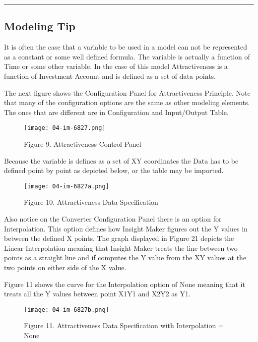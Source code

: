 \documentclass[]{memoir}
\makeatletter
\def\maxwidth{\ifdim\Gin@nat@width>\linewidth\linewidth
\else\Gin@nat@width\fi}
\let\Oldincludegraphics\includegraphics
\renewcommand{\includegraphics}[1]{\Oldincludegraphics[width=\maxwidth]{#1}}
\makeatother
\begin{document}
\begin{center}\rule{3in}{0.4pt}\end{center}

\subsection{Modeling Tip}

It is often the case that a variable to be used in a model can not be
represented as a constant or some well defined formula. The variable is
actually a function of Time or some other variable. In the case of this
model Attractiveness is a function of Investment Account and is defined
as a set of data points.

The next figure shows the Configuration Panel for Attractiveness
Principle. Note that many of the configuration options are the same as
other modeling elements. The ones that are different are in
Configuration and Input/Output Table.

\begin{figure}[htbp]
\centering
\texttt{[image: 04-im-6827.png]}
\caption{Figure 9. Attractiveness Control Panel}
\end{figure}

Because the variable is defines as a set of XY coordinates the Data has
to be defined point by point as depicted below, or the table may be
imported.

\begin{figure}[htbp]
\centering
\texttt{[image: 04-im-6827a.png]}
\caption{Figure 10. Attractiveness Data Specification}
\end{figure}

Also notice on the Converter Configuration Panel there is an option for
Interpolation. This option defines how Insight Maker figures out the Y
values in between the defined X points. The graph displayed in Figure 21
depicts the Linear Interpolation meaning that Insight Maker treats the
line between two points as a straight line and if computes the Y value
from the XY values at the two points on either side of the X value.

Figure 11 shows the curve for the Interpolation option of None meaning
that it treats all the Y values between point X1Y1 and X2Y2 as Y1.

\begin{figure}[htbp]
\centering
\texttt{[image: 04-im-6827b.png]}
\caption{Figure 11. Attractiveness Data Specification with Interpolation
= None}
\end{figure}
\end{document}
